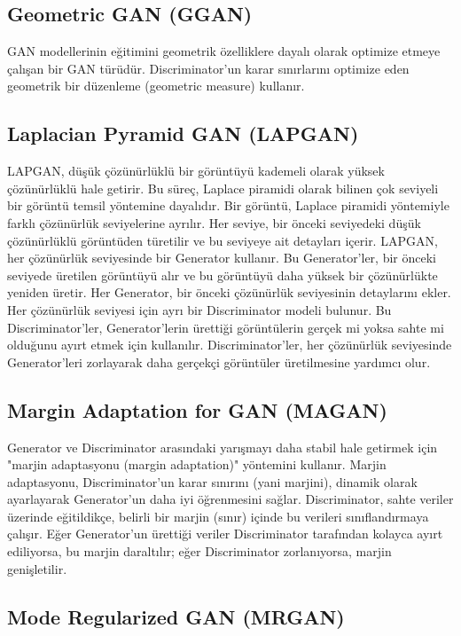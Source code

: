 \subsection{Geometric GAN (GGAN)}

GAN modellerinin eğitimini geometrik özelliklere dayalı olarak optimize etmeye çalışan bir GAN türüdür. Discriminator'un karar sınırlarını optimize eden geometrik bir düzenleme (geometric measure) kullanır. 

\subsection{Laplacian Pyramid GAN (LAPGAN)}

LAPGAN, düşük çözünürlüklü bir görüntüyü kademeli olarak yüksek çözünürlüklü hale getirir. Bu süreç, Laplace piramidi olarak bilinen çok seviyeli bir görüntü temsil yöntemine dayalıdır. Bir görüntü, Laplace piramidi yöntemiyle farklı çözünürlük seviyelerine ayrılır. Her seviye, bir önceki seviyedeki düşük çözünürlüklü görüntüden türetilir ve bu seviyeye ait detayları içerir. LAPGAN, her çözünürlük seviyesinde bir Generator kullanır. Bu Generator'ler, bir önceki seviyede üretilen görüntüyü alır ve bu görüntüyü daha yüksek bir çözünürlükte yeniden üretir. Her Generator, bir önceki çözünürlük seviyesinin detaylarını ekler. Her çözünürlük seviyesi için ayrı bir Discriminator modeli bulunur. Bu Discriminator'ler, Generator'lerin ürettiği görüntülerin gerçek mi yoksa sahte mi olduğunu ayırt etmek için kullanılır. Discriminator'ler, her çözünürlük seviyesinde Generator'leri zorlayarak daha gerçekçi görüntüler üretilmesine yardımcı olur. 

\subsection{Margin Adaptation for GAN (MAGAN)}

Generator ve Discriminator arasındaki yarışmayı daha stabil hale getirmek için "marjin adaptasyonu (margin adaptation)" yöntemini kullanır. Marjin adaptasyonu, Discriminator'un karar sınırını (yani marjini), dinamik olarak ayarlayarak Generator'un daha iyi öğrenmesini sağlar. Discriminator, sahte veriler üzerinde eğitildikçe, belirli bir marjin (sınır) içinde bu verileri sınıflandırmaya çalışır. Eğer Generator'un ürettiği veriler Discriminator tarafından kolayca ayırt ediliyorsa, bu marjin daraltılır; eğer Discriminator zorlanıyorsa, marjin genişletilir.

\subsection{Mode Regularized GAN (MRGAN)}

